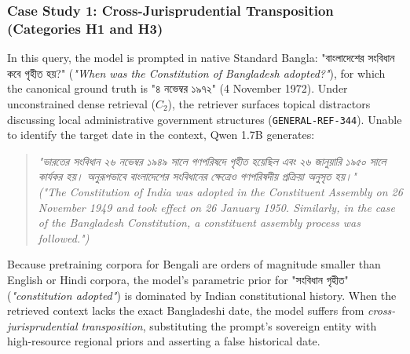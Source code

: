 \documentclass[11pt,a4paper,twocolumn]{article}
\DeclareRobustCommand{\foreignlanguage}[2]{#2}
\let\bengalifont\relax
\DeclareRobustCommand{\foreignlanguage}[2]{{\bengalifont #2}}
\DeclareRobustCommand{\foreignlanguage}[2]{#2}
\begin{document}
\subsubsection{Case Study 1: Cross-Jurisprudential Transposition (Categories H1 and H3)}
In this query, the model is prompted in native Standard Bangla: \foreignlanguage{bengali}{"বাংলাদেশের সংবিধান কবে গৃহীত হয়?"} (\emph{"When was the Constitution of Bangladesh adopted?"}), for which the canonical ground truth is \foreignlanguage{bengali}{"৪ নভেম্বর ১৯৭২"} (4 November 1972). Under unconstrained dense retrieval ($C_2$), the retriever surfaces topical distractors discussing local administrative government structures (\texttt{GENERAL-REF-344}). Unable to identify the target date in the context, Qwen 1.7B generates:
\begin{quote}
    \foreignlanguage{bengali}{\emph{"ভারতের সংবিধান ২৬ নভেম্বর ১৯৪৯ সালে গণপরিষদে গৃহীত হয়েছিল এবং ২৬ জানুয়ারি ১৯৫০ সালে কার্যকর হয়। অনুরূপভাবে বাংলাদেশের সংবিধানের ক্ষেত্রেও গণপরিষদীয় প্রক্রিয়া অনুসৃত হয়।"}} \\
    \emph{("The Constitution of India was adopted in the Constituent Assembly on 26 November 1949 and took effect on 26 January 1950. Similarly, in the case of the Bangladesh Constitution, a constituent assembly process was followed.")}
\end{quote}
Because pretraining corpora for Bengali are orders of magnitude smaller than English or Hindi corpora, the model's parametric prior for \foreignlanguage{bengali}{"সংবিধান গৃহীত"} (\emph{"constitution adopted"}) is dominated by Indian constitutional history. When the retrieved context lacks the exact Bangladeshi date, the model suffers from \emph{cross-jurisprudential transposition}, substituting the prompt's sovereign entity with high-resource regional priors and asserting a false historical date.
\end{document}
